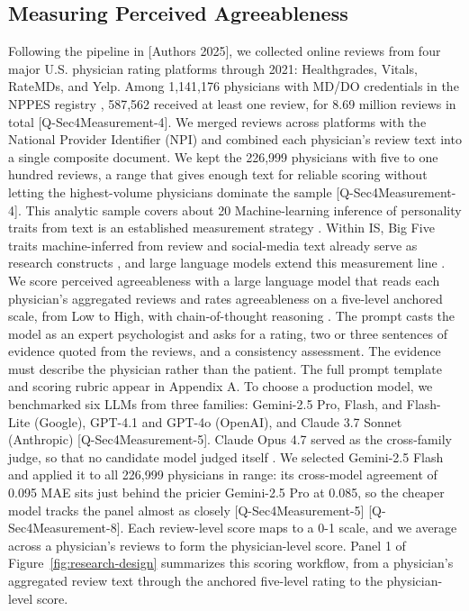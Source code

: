 \subsection{Measuring Perceived Agreeableness}
Following the pipeline in [Authors 2025], we collected online reviews from four major U.S. physician rating platforms through 2021: Healthgrades, Vitals, RateMDs, and Yelp. Among 1,141,176 physicians with MD/DO credentials in the NPPES registry \citep{cms_nppes}, 587,562 received at least one review, for 8.69 million reviews in total \citep{wang2022recency} [Q-Sec4Measurement-4]. We merged reviews across platforms with the National Provider Identifier (NPI) and combined each physician's review text into a single composite document. We kept the 226,999 physicians with five to one hundred reviews, a range that gives enough text for reliable scoring without letting the highest-volume physicians dominate the sample [Q-Sec4Measurement-4]. This analytic sample covers about 20%
Machine-learning inference of personality traits from text is an established measurement strategy \citep{schwartz2013personality, youyou2015computer, yang2023getting}. Within IS, Big Five traits machine-inferred from review and social-media text already serve as research constructs \citep{liu2021assessing, adamopoulos2018impact}, and large language models extend this measurement line \citep{peters2024personality, hu2024llm}. We score perceived agreeableness with a large language model that reads each physician's aggregated reviews and rates agreeableness on a five-level anchored scale, from Low to High, with chain-of-thought reasoning \citep{wei2022chain}. The prompt casts the model as an expert psychologist and asks for a rating, two or three sentences of evidence quoted from the reviews, and a consistency assessment. The evidence must describe the physician rather than the patient. The full prompt template and scoring rubric appear in Appendix A.
To choose a production model, we benchmarked six LLMs from three families: Gemini-2.5 Pro, Flash, and Flash-Lite (Google), GPT-4.1 and GPT-4o (OpenAI), and Claude 3.7 Sonnet (Anthropic) [Q-Sec4Measurement-5]. Claude Opus 4.7 served as the cross-family judge, so that no candidate model judged itself \citep{zheng2023judging}. We selected Gemini-2.5 Flash and applied it to all 226,999 physicians in range: its cross-model agreement of 0.095 MAE sits just behind the pricier Gemini-2.5 Pro at 0.085, so the cheaper model tracks the panel almost as closely [Q-Sec4Measurement-5] [Q-Sec4Measurement-8]. Each review-level score maps to a 0-1 scale, and we average across a physician's reviews to form the physician-level score. Panel 1 of Figure~\ref{fig:research-design} summarizes this scoring workflow, from a physician's aggregated review text through the anchored five-level rating to the physician-level score.
